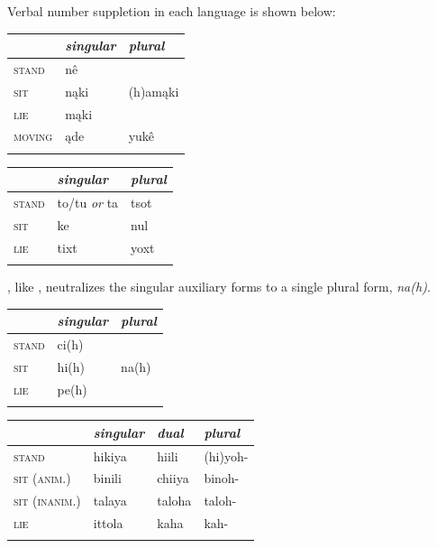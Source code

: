 \documentclass[output=paper]{LSP/langsci}
\begin{document}
	Verbal number suppletion in each language is shown below:

\ea
{\hspace{1em}}\newline
\settowidth{}
\begin{tabular}{lll}
\hhline{===}& \emph{singular} & \emph{plural}
\\ \hline \textsc{stand} & nê\footnotemark & \multirow{3}{*}{(h)amąki}
\\ \textsc{sit} & nąki & 
\\ \textsc{lie} & mąki & 
\\ \textsc{moving} & ąde & yukê 
\\ \hhline{===}
\end{tabular} 
\z

\ea
{\hspace{1em}}\newline
\settowidth{}
\begin{tabular}{lll}
\hhline{===}& \emph{singular} & \emph{plural}
\\ \hline \textsc{stand} & to/tu \emph{or} ta\footnotemark & tsot
\\ \textsc{sit} & ke & nul 
\\ \textsc{lie} & tixt & yoxt 
\\ \hhline{===}
\end{tabular} 
\z

, like , neutralizes the singular auxiliary forms to a single plural form, \emph{na(h)}.

\ea
{\hspace{1em}}\newline
\settowidth{}
\begin{tabular}{lll}
\hhline{===}& \emph{singular} & \emph{plural}
\\ \hline \textsc{stand} & ci(h)\footnotemark & \multirow{3}{*}{na(h)}
\\ \textsc{sit} & hi(h) & 
\\ \textsc{lie} & pe(h) & 
\\ \hhline{===}
\end{tabular} 
\z

\ea
{\hspace{1em}}\newline
\settowidth{}
\begin{tabular}{llll}
\hhline{====}& \emph{singular} & \emph{dual} & \emph{plural}
\\ \hline \textsc{stand} & hikiya\footnotemark & hiili & (hi)yoh-
\\ \textsc{sit (anim.)} & binili & chiiya & binoh- 
\\ \textsc{sit (inanim.)} & talaya & taloha & taloh- 
\\ \textsc{lie} & ittola & kaha & kah- 
\\ \hhline{====}
\end{tabular} 
\z
\end{document}
